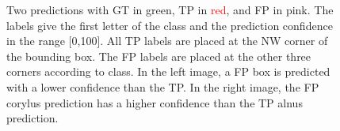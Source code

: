 \begin{figure}[htb]
\begin{subfigure}[t]{0.4\textwidth}
  \end{subfigure}
  \caption[Predictions showing TP overlapped by FP from different class]{Two predictions with GT in \textcolor{nicegreen}{green}, TP in \textcolor{red}{red}, and FP in \textcolor{nicepink}{pink}. The labels give the first letter of the class and the prediction confidence in the range [0,100]. All TP labels are placed at the NW corner of the bounding box. The FP labels are placed at the other three corners according to class. In the left image, a FP box is predicted with a lower confidence than the TP\@. In the right image, the FP corylus prediction has a higher confidence than the TP alnus prediction.}\label{fig:overlapping-predictions}
\end{figure}



